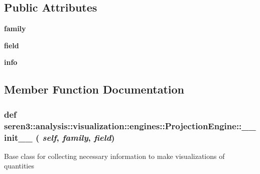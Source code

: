 \subsection*{Public Attributes}
\begin{DoxyCompactItemize}
\item 
\hypertarget{classseren3_1_1analysis_1_1visualization_1_1engines_1_1ProjectionEngine_aa8da5a1f2cee787101d8ab4880ed78ad}{
{\bfseries family}}
\label{classseren3_1_1analysis_1_1visualization_1_1engines_1_1ProjectionEngine_aa8da5a1f2cee787101d8ab4880ed78ad}

\item 
\hypertarget{classseren3_1_1analysis_1_1visualization_1_1engines_1_1ProjectionEngine_a05ef30ece1e238ed6b3c59efb5e7b6aa}{
{\bfseries field}}
\label{classseren3_1_1analysis_1_1visualization_1_1engines_1_1ProjectionEngine_a05ef30ece1e238ed6b3c59efb5e7b6aa}

\item 
\hypertarget{classseren3_1_1analysis_1_1visualization_1_1engines_1_1ProjectionEngine_ad483cc6b27820cf84c3c1c1d7239a04b}{
{\bfseries info}}
\label{classseren3_1_1analysis_1_1visualization_1_1engines_1_1ProjectionEngine_ad483cc6b27820cf84c3c1c1d7239a04b}

\end{DoxyCompactItemize}


\subsection{Member Function Documentation}
\hypertarget{classseren3_1_1analysis_1_1visualization_1_1engines_1_1ProjectionEngine_ab9066571de775d34e0a244225a4351fb}{
\subsubsection[{\_\-\_\-init\_\-\_\-}]{\setlength{\rightskip}{0pt plus 5cm}def seren3::analysis::visualization::engines::ProjectionEngine::\_\-\_\-init\_\-\_\- ( {\em self}, \/   {\em family}, \/   {\em field})}}
\label{classseren3_1_1analysis_1_1visualization_1_1engines_1_1ProjectionEngine_ab9066571de775d34e0a244225a4351fb}
\begin{DoxyVerb}
    Base class for collecting necessary information to make visualizations of quantities
\end{DoxyVerb}
 

